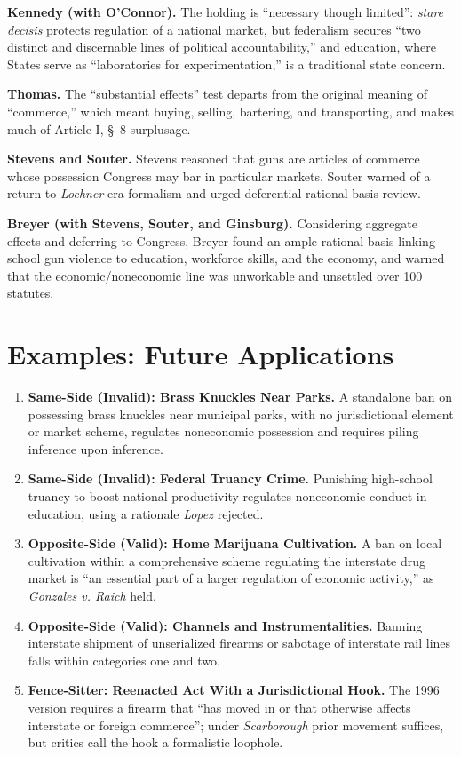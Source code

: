 \documentclass[12pt]{article}
\begin{document}
\textbf{Kennedy (with O'Connor).} The holding is ``necessary though limited'': \textit{stare decisis} protects regulation of a national market, but federalism secures ``two distinct and discernable lines of political accountability,'' and education, where States serve as ``laboratories for experimentation,'' is a traditional state concern.

\textbf{Thomas.} The ``substantial effects'' test departs from the original meaning of ``commerce,'' which meant buying, selling, bartering, and transporting, and makes much of Article I, \S~8 surplusage.

\textbf{Stevens and Souter.} Stevens reasoned that guns are articles of commerce whose possession Congress may bar in particular markets. Souter warned of a return to \textit{Lochner}-era formalism and urged deferential rational-basis review.

\textbf{Breyer (with Stevens, Souter, and Ginsburg).} Considering aggregate effects and deferring to Congress, Breyer found an ample rational basis linking school gun violence to education, workforce skills, and the economy, and warned that the economic/noneconomic line was unworkable and unsettled over 100 statutes.

\section{Examples: Future Applications}

\begin{enumerate}
\item \textbf{Same-Side (Invalid): Brass Knuckles Near Parks.} A standalone ban on possessing brass knuckles near municipal parks, with no jurisdictional element or market scheme, regulates noneconomic possession and requires piling inference upon inference.
\item \textbf{Same-Side (Invalid): Federal Truancy Crime.} Punishing high-school truancy to boost national productivity regulates noneconomic conduct in education, using a rationale \textit{Lopez} rejected.
\item \textbf{Opposite-Side (Valid): Home Marijuana Cultivation.} A ban on local cultivation within a comprehensive scheme regulating the interstate drug market is ``an essential part of a larger regulation of economic activity,'' as \textit{Gonzales v. Raich} held.
\item \textbf{Opposite-Side (Valid): Channels and Instrumentalities.} Banning interstate shipment of unserialized firearms or sabotage of interstate rail lines falls within categories one and two.
\item \textbf{Fence-Sitter: Reenacted Act With a Jurisdictional Hook.} The 1996 version requires a firearm that ``has moved in or that otherwise affects interstate or foreign commerce''; under \textit{Scarborough} prior movement suffices, but critics call the hook a formalistic loophole.
\end{enumerate}
\end{document}
